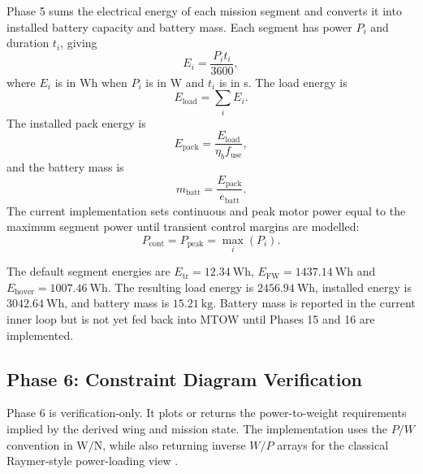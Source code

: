 Phase 5 sums the electrical energy of each mission segment and converts it into installed battery capacity and battery mass. Each segment has power \(P_i\) and duration \(t_i\), giving
\begin{equation}
    E_i = \frac{P_i t_i}{3600},
    \label{eq:ppa_segment_energy}
\end{equation}
where \(E_i\) is in Wh when \(P_i\) is in W and \(t_i\) is in s. The load energy is
\begin{equation}
    E_{\mathrm{load}}=\sum_i E_i.
    \label{eq:ppa_load_energy}
\end{equation}
The installed pack energy is
\begin{equation}
    E_{\mathrm{pack}}=
    \frac{E_{\mathrm{load}}}{\eta_b f_{\mathrm{use}}},
    \label{eq:ppa_pack_energy}
\end{equation}
and the battery mass is
\begin{equation}
    m_{\mathrm{batt}}=
    \frac{E_{\mathrm{pack}}}{e_{\mathrm{batt}}}.
    \label{eq:ppa_battery_mass}
\end{equation}
The current implementation sets continuous and peak motor power equal to the maximum segment power until transient control margins are modelled:
\begin{equation}
    P_{\mathrm{cont}}=P_{\mathrm{peak}}=\max_i(P_i).
    \label{eq:ppa_peak_power}
\end{equation}

The default segment energies are \(E_{\mathrm{tr}}=12.34~\mathrm{Wh}\), \(E_{\mathrm{FW}}=1437.14~\mathrm{Wh}\) and \(E_{\mathrm{hover}}=1007.46~\mathrm{Wh}\). The resulting load energy is \(2456.94~\mathrm{Wh}\), installed energy is \(3042.64~\mathrm{Wh}\), and battery mass is \(15.21~\mathrm{kg}\). Battery mass is reported in the current inner loop but is not yet fed back into MTOW until Phases 15 and 16 are implemented.

\subsection{Phase 6: Constraint Diagram Verification}
\label{subsec:ppa_phase6}

Phase 6 is verification-only. It plots or returns the power-to-weight requirements implied by the derived wing and mission state. The implementation uses the \(P/W\) convention in \(\mathrm{W/N}\), while also returning inverse \(W/P\) arrays for the classical Raymer-style power-loading view \cite{Raymer2018}.

